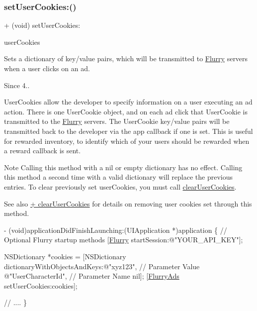 \subsubsection{\texorpdfstring{set\+User\+Cookies\+:()}{setUserCookies:()}}
{\footnotesize\ttfamily + (void) set\+User\+Cookies\+: \begin{DoxyParamCaption}\item[{(N\+S\+Dictionary $\ast$)}]{user\+Cookies }\end{DoxyParamCaption}}



Sets a dictionary of key/value pairs, which will be transmitted to \hyperlink{interfaceFlurry}{Flurry} servers when a user clicks on an ad. 

\begin{DoxySince}{Since}
4..
\end{DoxySince}
User\+Cookies allow the developer to specify information on a user executing an ad action. There is one User\+Cookie object, and on each ad click that User\+Cookie is transmitted to the \hyperlink{interfaceFlurry}{Flurry} servers. The User\+Cookie key/value pairs will be transmitted back to the developer via the app callback if one is set. This is useful for rewarded inventory, to identify which of your users should be rewarded when a reward callback is sent.

\begin{DoxyNote}{Note}
Calling this method with a nil or empty dictionary has no effect. Calling this method a second time with a valid dictionary will replace the previous entries. To clear previously set user\+Cookies, you must call \hyperlink{interfaceFlurryAds_a5bd6c927d8116fe1c39ac47b9c7015d2}{clear\+User\+Cookies}. 
\end{DoxyNote}
\begin{DoxySeeAlso}{See also}
\hyperlink{interfaceFlurryAds_a5bd6c927d8116fe1c39ac47b9c7015d2}{+ clear\+User\+Cookies} for details on removing user cookies set through this method.
\end{DoxySeeAlso}

\begin{DoxyCode}
- (void)applicationDidFinishLaunching:(UIApplication *)application 
\{
    \textcolor{comment}{// Optional Flurry startup methods}
    [\hyperlink{interfaceFlurry}{Flurry} startSession:\textcolor{stringliteral}{@"YOUR\_API\_KEY"}];

    NSDictionary *cookies =
        [NSDictionary dictionaryWithObjectsAndKeys:\textcolor{stringliteral}{@"xyz123"}, \textcolor{comment}{// Parameter Value}
        \textcolor{stringliteral}{@"UserCharacterId"}, \textcolor{comment}{// Parameter Name}
        nil];
    [\hyperlink{interfaceFlurryAds}{FlurryAds} setUserCookies:cookies];

    \textcolor{comment}{// ....}
\}
\end{DoxyCode}



